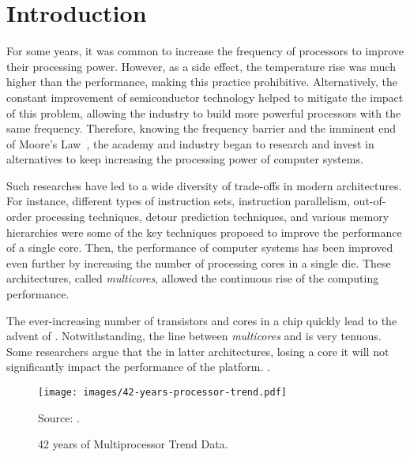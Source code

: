 \chapter{Introduction}
\label{ch.intro}

	For some years, it was common to increase the frequency of processors
	to improve their processing power.
	However, as a side effect, the temperature rise was much higher than the
	performance, making this practice prohibitive.
	Alternatively, the constant improvement of semiconductor technology helped
	to mitigate the impact of this problem, allowing the industry to build
	more powerful processors with the same frequency.
	Therefore, knowing the frequency barrier and the imminent end of Moore's Law~\cite{moore:1965},
	the academy and industry began to research and invest in alternatives
	to keep increasing the processing power of computer systems.

	Such researches have led to a wide diversity of trade-offs in modern architectures.
	For instance, different types of instruction sets, instruction parallelism,
	out-of-order processing techniques, detour prediction techniques, and various
	memory hierarchies were some of the key techniques proposed to improve the
	performance of a single core.
	Then, the performance of computer systems has been improved even further by
	increasing the number of processing cores in a single die.
	These architectures, called \textit{multicores}, allowed the continuous
	rise of the computing performance.

	The ever-increasing number of transistors and cores in a chip quickly lead
	to the advent of \manycores.
	Notwithstanding, the line between \textit{multicores} and \manycores is very tenuous.
	Some researchers argue that the in latter architectures, losing a core it will not
	significantly impact the performance of the platform.
	.

	\begin{figure}[t]
		\centering
		\caption{42 years of Multiprocessor Trend Data.}
		
		\texttt{[image: images/42-years-processor-trend.pdf]}

		Source: \cite{url:microprocessor-trend-data}.

		\label{fig.microprocessor-data}
	\end{figure}

